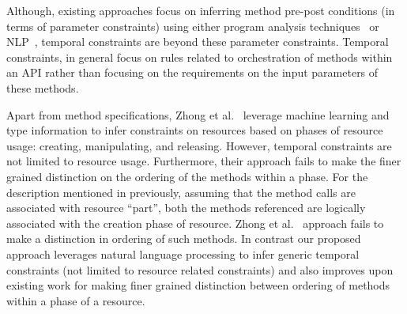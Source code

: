 


Although, existing approaches focus on inferring method pre-post conditions (in terms of parameter constraints) using either program analysis techniques~\cite{Henkel07discoveringdocumentation,Ghezzi:2009:SIB:1555001.1555057,Henkel:2008:DDA:1363102.1363105,Flanagan2001:HAA,Buse:2008:ADI:1390630.1390664} or NLP~\cite{pandita12:inferring, wu2013inferring}, temporal constraints are beyond these parameter constraints.
Temporal constraints, in general focus on rules related to orchestration of methods within an API rather than focusing on the requirements on the input parameters of these methods.

Apart from method specifications, Zhong et al.~\cite{zhong09SE} leverage machine learning and type information to infer constraints on resources based on phases of resource usage: creating, manipulating, and releasing. However, temporal constraints are not limited to resource usage. Furthermore, their approach fails to make the finer grained distinction on the ordering of the methods within a phase. For the description mentioned in previously, assuming that the method calls are associated with resource ``part'', both the methods referenced are logically associated with the creation phase of resource. Zhong et al.~\cite{zhong09SE} approach fails to make a distinction in ordering of such methods. In contrast our proposed approach leverages natural language processing to infer generic temporal constraints (not limited to resource related constraints) and also improves upon existing work for making finer grained distinction between ordering of methods within a phase of a resource. 



